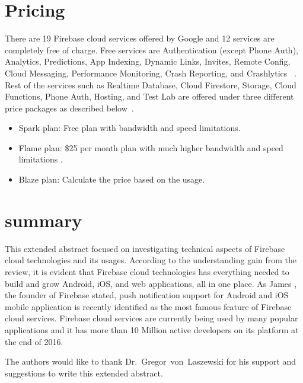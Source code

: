\section{Pricing} There are 19 Firebase cloud services offered by Google and 12
services are completely free of charge. Free services are Authentication (except
Phone Auth), Analytics, Predictions, App Indexing, Dynamic Links, Invites,
Remote Config, Cloud Messaging, Performance Monitoring, Crash Reporting, and
Crashlytics ~\cite{hid-sp18-409-www-firebase-pricing}. Rest of the services such
as Realtime Database, Cloud Firestore, Storage, Cloud Functions, Phone Auth,
Hosting, and Test Lab are offered under three different price packages as
described below~\cite{hid-sp18-409-www-firebase-pricing}.

\begin{itemize} \item Spark plan: Free plan with bandwidth and speed
	limitations. \item Flame plan: \$25 per month plan with much higher 
	bandwidth
	and speed limitations . \item Blaze plan: Calculate the price based on the
	usage. \end{itemize}

\section{summary} This extended abstract focused on investigating technical aspects of
Firebase cloud technologies and its usages. According to the understanding gain
from the review, it is evident that Firebase cloud technologies has everything
needed to build and grow Android, iOS, and web applications, all in one place.
As James \cite{hid-sp18-409-www-firebase}, the founder of Firebase stated, push
notification support for Android and iOS mobile application is recently
identified as the most famous feature of Firebase cloud services. Firebase cloud
services are currently being used by many popular applications and it has more
than 10 Million active developers on its platform  at the end of
2016\cite{hid-sp18-409-www-firebase}.

\begin{acks}
	
	The authors would like to thank Dr.~Gregor~von~Laszewski for his support and
	suggestions to write this extended abstract.
	
\end{acks}


 

